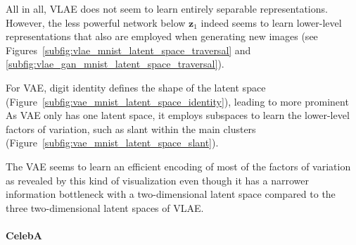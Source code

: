 All in all, \ac{VLAE} does not seem to learn entirely separable representations.
However, the less powerful network below $\bm{z}_1$ indeed seems to learn lower-level representations that also are employed when generating new images (see Figures~\ref{subfig:vlae_mnist_latent_space_traversal} and \ref{subfig:vlae_gan_mnist_latent_space_traversal}).

For \ac{VAE}, digit identity defines the shape of the latent space (Figure~\ref{subfig:vae_mnist_latent_space_identity}), leading to more prominent 
As \ac{VAE} only has one latent space, it employs subspaces to learn the lower-level factors of variation, such as slant within the main clusters (Figure~\ref{subfig:vae_mnist_latent_space_slant}).

The \ac{VAE} seems to learn an efficient encoding of most of the factors of variation as revealed by this kind of visualization even though it has a narrower information bottleneck with a two-dimensional latent space compared to the three two-dimensional latent spaces of \ac{VLAE}.

\paragraph{CelebA}

